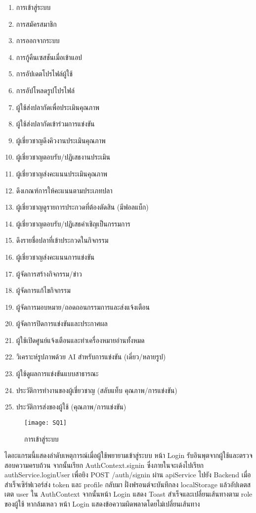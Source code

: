 \begin{enumerate}
	\item การเข้าสู่ระบบ
	\item การสมัครสมาชิก
	\item การออกจากระบบ
	\item การกู้คืนเซสชันเมื่อเข้าแอป
	\item การอัปเดตโปรไฟล์ผู้ใช้
	\item การอัปโหลดรูปโปรไฟล์
	\item ผู้ใช้ส่งปลากัดเพื่อประเมินคุณภาพ
	\item ผู้ใช้ส่งปลากัดเข้าร่วมการแข่งขัน
	\item ผู้เชี่ยวชาญดึงคิวงานประเมินคุณภาพ
	\item ผู้เชี่ยวชาญตอบรับ/ปฏิเสธงานประเมิน
	\item ผู้เชี่ยวชาญส่งคะแนนประเมินคุณภาพ
	\item ดึงเกณฑ์การให้คะแนนตามประเภทปลา
	\item ผู้เชี่ยวชาญดูรายการประกวดที่ต้องตัดสิน (มีฟอลแบ็ก)
	\item ผู้เชี่ยวชาญตอบรับ/ปฏิเสธคำเชิญเป็นกรรมการ
	\item ดึงรายชื่อปลาที่เข้าประกวดในกิจกรรม
	\item ผู้เชี่ยวชาญส่งคะแนนการแข่งขัน
	\item ผู้จัดการสร้างกิจกรรม/ข่าว
	\item ผู้จัดการแก้ไขกิจกรรม
	\item ผู้จัดการมอบหมาย/ถอดถอนกรรมการและส่งแจ้งเตือน
	\item ผู้จัดการปิดการแข่งขันและประกาศผล
	\item ผู้ใช้เปิดศูนย์แจ้งเตือนและทำเครื่องหมายอ่านทั้งหมด
	\item วิเคราะห์รูปภาพด้วย AI สำหรับการแข่งขัน (เดี่ยว/หลายรูป)
	\item ผู้ใช้ดูผลการแข่งขันแบบสาธารณะ
	\item ประวัติการทำงานของผู้เชี่ยวชาญ (สลับแท็บ คุณภาพ/การแข่งขัน)
	\item ประวัติการส่งของผู้ใช้ (คุณภาพ/การแข่งขัน)
\end{enumerate}

\vspace{\baselineskip}

\begin{figure}[h]
	\centering
	\texttt{[image: SQ1]}
	\caption{การเข้าสู่ระบบ}
\end{figure}

\indent ไดอะแกรมนี้แสดงลำดับเหตุการณ์เมื่อผู้ใช้พยายามเข้าสู่ระบบ หน้า Login รับอินพุตจากผู้ใช้และตรวจสอบความครบถ้วน จากนั้นเรียก AuthContext.signin ซึ่งภายในจะเด้งไปเรียก authService.loginUser เพื่อยิง POST /auth/signin ผ่าน apiService ไปยัง Backend เมื่อสำเร็จเซิร์ฟเวอร์ส่ง token และ profile กลับมา ฝั่งฟรอนต์จะบันทึกลง localStorage แล้วอัปเดตสเตต user ใน AuthContext จากนั้นหน้า Login แสดง Toast สำเร็จและเปลี่ยนเส้นทางตาม role ของผู้ใช้ หากล้มเหลว หน้า Login แสดงข้อความผิดพลาดโดยไม่เปลี่ยนเส้นทาง


